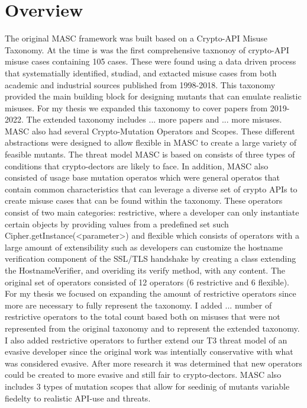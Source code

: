 \section{Overview}
\label{ch1:sec:overview}


The original MASC framework was built based on a Crypto-API Misuse Taxonomy. At the time is was the first comprehensive taxnonoy of crypto-API misuse cases containing 105 cases. These were found using a data driven process that systematially identified, studiad, and extacted misuse cases from both academic and industrial sources published from 1998-2018. This taxonomy provided the main building block for designing mutants that can emulate realistic misuses. For my thesis we expanded this taxonomy to cover papers from 2019-2022. The extended taxonomy includes ... more papers and ... more misuses.
MASC also had several Crypto-Mutation Operators and Scopes. These different abstractions were designed to allow flexible in MASC to create a large variety of feasible mutants. The threat model MASC is based on consists of three types of conditions that crypto-dectors are likely to face. In addition, MASC also consisted of usage base mutation operatos which were general operatos that contain common characteristics that can leverage a diverse set of crypto APIs to create misuse cases that can be found within the taxonomy. These operators consist of two main categories: restrictive, where a developer can only instantiate certain objects by providing values from a predefined set such Cipher.getInstance(<parameter>) and flexible which consists of operators with a large amount of extensibility such as developers can customize the hostname verification component of the SSL/TLS handshake by creating a class extending the HostnameVerifier, and overiding its verify method, with any content. The original set of operators consisted of 12 operators (6 restrictive and 6 flexible). For my thesis we focused on expanding the amount of restrictive operators since more are necessary to fully represent the taxonomy. I added ... number of restrictive operators to the total count based both on misuses that were not represented from the original taxonomy and to represent the extended taxonomy. I also added restrictive operators to further extend our T3 threat model of an evasive developer since the original work was intentially conservative with what was considered evasive. After more research it was determined that new operators could be created to more evasive and still fair to crypto-dectors. MASC also includes 3 types of mutation scopes that allow for seedinig of mutants variable fiedelty to realistic API-use and threats.
